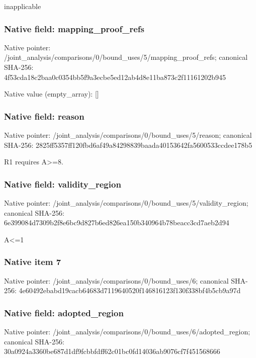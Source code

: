 \documentclass[10pt,a4paper]{article}
\begin{document}
\begingroup\raggedright\sloppy inapplicable\par\endgroup

\subsubsection{Native field: mapping\_\allowbreak{}proof\_\allowbreak{}refs}
Native pointer: /joint\_\allowbreak{}analysis/comparisons/0/bound\_\allowbreak{}uses/5/mapping\_\allowbreak{}proof\_\allowbreak{}refs; canonical SHA-256: 4f53cda18c2baa0c0354bb5f9a3ecbe5ed12ab4d8e11ba873c2f11161202b945

Native value (empty\_\allowbreak{}array): []

\subsubsection{Native field: reason}
Native pointer: /joint\_\allowbreak{}analysis/comparisons/0/bound\_\allowbreak{}uses/5/reason; canonical SHA-256: 2825ff5357ff120fbd6af49a84298839baada40153642fa5600533ccdee178b5

\begingroup\raggedright\sloppy R1 requires A>=\allowbreak{}8.\par\endgroup

\subsubsection{Native field: validity\_\allowbreak{}region}
Native pointer: /joint\_\allowbreak{}analysis/comparisons/0/bound\_\allowbreak{}uses/5/validity\_\allowbreak{}region; canonical SHA-256: 6e399084d7309b2f8e6bc9d827b6ed826ea150b340964b78beacc3cd7aeb2d94

\begingroup\raggedright\sloppy A<=\allowbreak{}1\par\endgroup

\subsubsection{Native item 7}
Native pointer: /joint\_\allowbreak{}analysis/comparisons/0/bound\_\allowbreak{}uses/6; canonical SHA-256: 4e60492ebabd19cacb64683d7119640520f146816123f130f338bf4b5cb9a97d

\subsubsection{Native field: adopted\_\allowbreak{}region}
Native pointer: /joint\_\allowbreak{}analysis/comparisons/0/bound\_\allowbreak{}uses/6/adopted\_\allowbreak{}region; canonical SHA-256: 30a0924a3360be687d1df9fcbbfdff62c01bc0fd14036ab9076cf7f451568666
\end{document}

